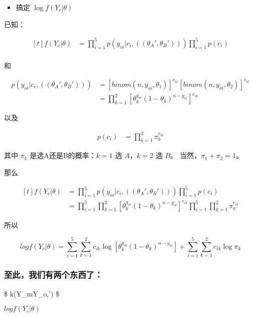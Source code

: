 \documentclass[11pt]{article}
\providecommand{\tightlist}{%
      \setlength{\itemsep}{0pt}\setlength{\parskip}{0pt}}
\begin{document}
\begin{itemize}
\tightlist
\item
  搞定 \(\log f(Y_c|\theta)\)
\end{itemize}

已知：

\[\begin{aligned}[t] f(Y_c|\theta) &= \prod_{i=1}^5 p(y_{oi}|c_i,( (\theta_A', \theta_B'))) \prod_{i=1}^5 p(c_i)\\ \end{aligned}\]

和

\[\begin{aligned} p(y_{oi}|c_i,( (\theta_A', \theta_B'))) &= \left[ binom(n, y_{oi}, \theta_1 ) \right]^{c_{i1} } \left[ binom(n, y_{oi}, \theta_2 ) \right]^{c_{i2} } \\ &= \prod_{k=1}^2 \left[\theta_k^{y_{oi}} (1-\theta_k)^{n - y_{oi}}\right]^{c_{ik}} \end{aligned}\]

以及

\[\begin{aligned} p(c_i) &= \prod_{k=1}^2 \pi_k^{c_{ik}} \end{aligned}\]

其中 \(\pi_k\) 是选A还是B的概率：\(k=1\) 选 \(A\)，\(k=2\) 选 \(B\)。
当然，\(\pi_1 + \pi_2 = 1\)。

那么

\[\begin{aligned}[t] f(Y_c|\theta) &= \prod_{i=1}^5 p(y_{oi}|c_i,( (\theta_A', \theta_B'))) \prod_{i=1}^5 p(c_i)\\ &= \prod_{i=1}^5 \prod_{k=1}^2 \left[\theta_k^{y_{oi}} (1-\theta_k)^{n - y_{oi}}\right]^{c_{ik}} \prod_{i=1}^5 \prod_{k=1}^2 \pi_k^{c_{ik}} \end{aligned}\]

所以

\[ log f(Y_c|\theta) = \sum_{i=1}^5 \sum_{k=1}^2 c_{ik} \log \left[\theta_k^{y_{oi}} (1-\theta_k)^{n - y_{oi}} \right] + \sum_{i=1}^5 \sum_{k=1}^2 c_{ik} \log \pi_k\]

    \subsubsection{至此，我们有两个东西了：}\label{ux81f3ux6b64ux6211ux4eecux6709ux4e24ux4e2aux4e1cux897fux4e86}

\$ k(Y\_m\textbar{}Y\_o,\theta') \$

\(log f(Y_c|\theta)\)
\end{document}
